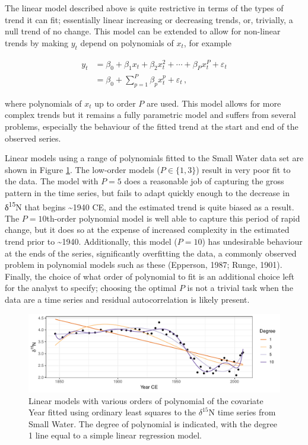 \documentclass[12pt,]{article}
\begin{document}
The linear model described above is quite restrictive in terms of the
types of trend it can fit; essentially linear increasing or decreasing
trends, or, trivially, a null trend of no change. This model can be
extended to allow for non-linear trends by making \(y_t\) depend on
polynomials of \(x_t\), for example

\begin{align} \label{eq:polynomial-model}
y_t &= \beta_0 + \beta_1 x_t + \beta_2 x_t^2 + \cdots + \beta_P x_t^P + \varepsilon_t \\
    &= \beta_0 + \sum_{p = 1}^P \beta_p x_t^p  + \varepsilon_t \,, \nonumber
\end{align}

where polynomials of \(x_t\) up to order \(P\) are used. This model
allows for more complex trends but it remains a fully parametric model
and suffers from several problems, especially the behaviour of the
fitted trend at the start and end of the observed series.

Linear models using a range of polynomials fitted to the Small Water
data set are shown in Figure \ref{fig:polynomial-example-plot}. The
low-order models (\(P \in \{1, 3\}\)) result in very poor fit to the
data. The model with \(P = 5\) does a reasonable job of capturing the
gross pattern in the time series, but fails to adapt quickly enough to
the decrease in δ\textsuperscript{15}N that begins \textasciitilde{}1940
CE, and the estimated trend is quite biased as a result. The
\(P = 10\)th-order polynomial model is well able to capture this period
of rapid change, but it does so at the expense of increased complexity
in the estimated trend prior to \textasciitilde{}1940. Additionally,
this model (\(P = 10\)) has undesirable behaviour at the ends of the
series, significantly overfitting the data, a commonly observed problem
in polynomial models such as these (Epperson, 1987; Runge, 1901).
Finally, the choice of what order of polynomial to fit is an additional
choice left for the analyst to specify; choosing the optimal \(P\) is
not a trivial task when the data are a time series and residual
autocorrelation is likely present.

\begin{figure}

{\centering \includegraphics[width=0.8\linewidth]{manuscript_files/figure-latex/polynomial-example-plot-1} 

}

\caption{Linear models with various orders of polynomial of the covariate Year fitted using ordinary least squares to the $\delta^{15}\text{N}$ time series from Small Water. The degree of polynomial is indicated, with the degree 1 line equal to a simple linear regression model.}\label{fig:polynomial-example-plot}
\end{figure}
\end{document}
